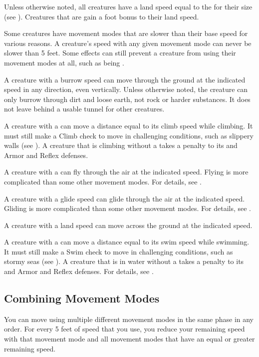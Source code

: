     Unless otherwise noted, all creatures have a land speed equal to the  for their size (see ).
    Creatures that are  gain a  foot bonus to their land speed.

    Some creatures have movement modes that are slower than their base speed for various reasons.
    A creature's speed with any given movement mode can never be slower than 5 feet.
    Some effects can still prevent a creature from using their movement modes at all, such as being \immobilized.

    A creature with a burrow speed can move through the ground at the indicated speed in any direction, even vertically.
    Unless otherwise noted, the creature can only burrow through dirt and loose earth, not rock or harder substances.
    It does not leave behind a usable tunnel for other creatures.

    A creature with a  can move a distance equal to its climb speed while climbing.
    It must still make a Climb check to move in challenging conditions, such as slippery walls (see ).
    A creature that is climbing without a  takes a  penalty to its  and Armor and Reflex defenses.

    A creature with a  can fly through the air at the indicated speed.
    Flying is more complicated than some other movement modes.
    For details, see .

    A creature with a glide speed can glide through the air at the indicated speed.
    Gliding is more complicated than some other movement modes.
    For details, see .

    A creature with a land speed can move across the ground at the indicated speed.

    A creature with a  can move a distance equal to its swim speed while swimming.
    It must still make a Swim check to move in challenging conditions, such as stormy seas (see ).
    A creature that is in water without a  takes a  penalty to its  and Armor and Reflex defenses.
    For details, see .

  \subsection{Combining Movement Modes}
    You can move using multiple different movement modes in the same phase in any order.
    For every 5 feet of speed that you use, you reduce your remaining speed with that movement mode and all movement modes that have an equal or greater remaining speed.

